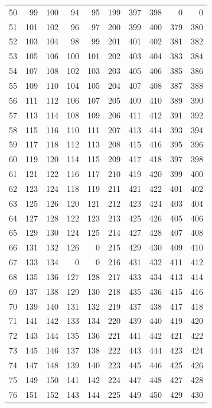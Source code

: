 \begin{longtable}{rrrrr@{\qquad}rrrrr}
50 & 99 & 100 & 94 & 95 & 199 & 397 & 398 & 0 & 0 \\
51 & 101 & 102 & 96 & 97 & 200 & 399 & 400 & 379 & 380 \\
52 & 103 & 104 & 98 & 99 & 201 & 401 & 402 & 381 & 382 \\
53 & 105 & 106 & 100 & 101 & 202 & 403 & 404 & 383 & 384 \\
54 & 107 & 108 & 102 & 103 & 203 & 405 & 406 & 385 & 386 \\
55 & 109 & 110 & 104 & 105 & 204 & 407 & 408 & 387 & 388 \\
56 & 111 & 112 & 106 & 107 & 205 & 409 & 410 & 389 & 390 \\
57 & 113 & 114 & 108 & 109 & 206 & 411 & 412 & 391 & 392 \\
58 & 115 & 116 & 110 & 111 & 207 & 413 & 414 & 393 & 394 \\
59 & 117 & 118 & 112 & 113 & 208 & 415 & 416 & 395 & 396 \\
60 & 119 & 120 & 114 & 115 & 209 & 417 & 418 & 397 & 398 \\
61 & 121 & 122 & 116 & 117 & 210 & 419 & 420 & 399 & 400 \\
62 & 123 & 124 & 118 & 119 & 211 & 421 & 422 & 401 & 402 \\
63 & 125 & 126 & 120 & 121 & 212 & 423 & 424 & 403 & 404 \\
64 & 127 & 128 & 122 & 123 & 213 & 425 & 426 & 405 & 406 \\
65 & 129 & 130 & 124 & 125 & 214 & 427 & 428 & 407 & 408 \\
66 & 131 & 132 & 126 & 0 & 215 & 429 & 430 & 409 & 410 \\
67 & 133 & 134 & 0 & 0 & 216 & 431 & 432 & 411 & 412 \\
68 & 135 & 136 & 127 & 128 & 217 & 433 & 434 & 413 & 414 \\
69 & 137 & 138 & 129 & 130 & 218 & 435 & 436 & 415 & 416 \\
70 & 139 & 140 & 131 & 132 & 219 & 437 & 438 & 417 & 418 \\
71 & 141 & 142 & 133 & 134 & 220 & 439 & 440 & 419 & 420 \\
72 & 143 & 144 & 135 & 136 & 221 & 441 & 442 & 421 & 422 \\
73 & 145 & 146 & 137 & 138 & 222 & 443 & 444 & 423 & 424 \\
74 & 147 & 148 & 139 & 140 & 223 & 445 & 446 & 425 & 426 \\
75 & 149 & 150 & 141 & 142 & 224 & 447 & 448 & 427 & 428 \\
76 & 151 & 152 & 143 & 144 & 225 & 449 & 450 & 429 & 430 \\

\end{longtable}
